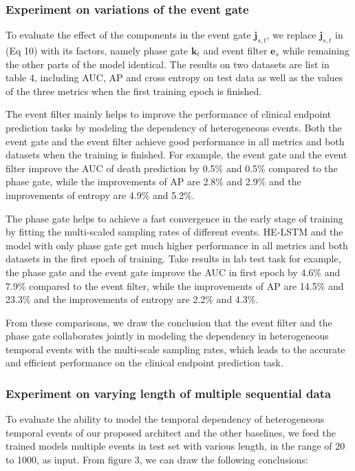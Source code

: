 \documentclass[letterpaper]{article} %
\begin{document}
\subsubsection{Experiment on variations of the event gate}
To evaluate the effect of the components in the event gate $\bm j_{s,t}$, we replace  $\bm j_{s,t}$ in (Eq 10) with its factors, namely phase gate $\bm k_t$ and event filter $\bm e_s$ while remaining the other parts of the model identical.
The results on two datasets are list in table 4, including AUC, AP and cross entropy on test data as well as the values of the three metrics when the first training epoch is finished.  

The event filter mainly helps to improve the performance of clinical endpoint prediction tasks by modeling the dependency of heterogeneous events. Both the event gate and the event filter achieve good performance in all metrics and both datasets when the training is finished.
For example, the event gate and the event filter improve the AUC of death prediction by 0.5\% and 0.5\% compared to the phase gate, while the improvements of AP are 2.8\% and 2.9\% and the improvements of entropy are 4.9\% and 5.2\%.

The phase gate helps to achieve a fast convergence in the early stage of training by fitting the multi-scaled sampling rates of different events. HE-LSTM and the model with only phase gate get much higher performance in all metrics and both datasets in the first epoch of training.
Take results in lab test task for example, the phase gate and the event gate improve the AUC in first epoch by 4.6\% and 7.9\% compared to the event filter, while the improvements of AP are 14.5\% and 23.3\% and the improvements of entropy are 2.2\% and 4.3\%.

From these comparisons, we draw the conclusion that the event filter and the phase gate collaborates jointly in modeling the dependency in heterogeneous temporal events with the multi-scale sampling rates, which leads to the accurate and efficient performance on the clinical endpoint prediction task.





\subsubsection{Experiment on varying length of multiple sequential data}

To evaluate the ability to model the temporal dependency of heterogeneous temporal events of our proposed architect and the other baselines, we feed the trained models multiple events in test set with various length, in the range of 20 to 1000, as input. From figure 3, we can draw the following conclusions:
\end{document}
